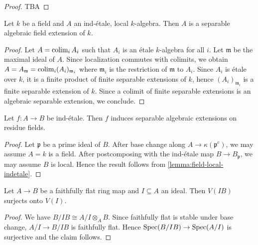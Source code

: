 \begin{proof}
    TBA
\end{proof}

\begin{lemma}
    Let $k$ be a field and $A$ an ind-étale, local $k$-algebra. Then $A$ is
    a separable algebraic field extension of $k$.
    \label{lemma:field-local-indetale}
\end{lemma}

\begin{proof}
    Let $A = \operatorname{colim}_i A_i$ such that $A_i$ is an étale $k$-algebra for all $i$.
    Let $\mathfrak{m}$ be the maximal ideal of $A$. Since localization commutes with colimits,
    we obtain $A = A_{\mathfrak{m}} = \operatorname{colim}_i (A_i)_{\mathfrak{m}_i}$ where
    $\mathfrak{m}_i$ is the restriction of $\mathfrak{m}$ to $A_i$. Since $A_i$ is étale over $k$,
    it is a finite product of finite separable extensions of $k$, hence $(A_i)_{\mathfrak{m}_i}$
    is a finite separable extension of $k$. Since a colimit of finite separable
    extensions is an algebraic separable extension, we conclude.
\end{proof}

\begin{proposition}
    Let $f\colon A \to B$ be ind-étale. Then $f$ induces separable algebraic extensions on residue fields.
    \label{prop:ind-etale-residue-fields}
\end{proposition}

\begin{proof}
    Let $\mathfrak{p}$ be a prime ideal of $B$. After base change along $A \to \kappa(\mathfrak{p}^c)$,
    we may assume $A = k$ is a field. After postcomposing with the ind-étale map $B \to B_{\mathfrak{p}}$,
    we may assume $B$ is local. Hence the result follows from \ref{lemma:field-local-indetale}.
\end{proof}

\begin{lemma}
    Let $A \to B$ be a faithfully flat ring map and $I \subseteq A$ an ideal.
    Then $V(IB)$ surjects onto $V(I)$.
    \label{lemma:faithfully-flat-surject-closed}
\end{lemma}

\begin{proof}
    We have $B / I B \cong A / I \otimes_A B$. Since faithfully flat is stable under base change,
    $A / I \to B / IB$ is faithfully flat. Hence $\mathrm{Spec}(B / IB) \to \mathrm{Spec}(A / I)$ is surjective
    and the claim follows.
\end{proof}

